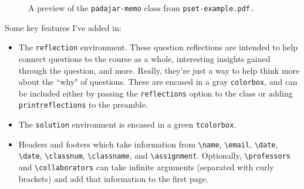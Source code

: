 \documentclass[11pt]{padajar-memo}
\newcommand{\ttslash}[1]{\texttt{\textbackslash #1}}
\begin{document}
\begin{figure}[ht]
	\caption{A preview of the \texttt{padajar-memo} class from \texttt{pset-example.pdf.}}
	\begin{center}
	\end{center}
\end{figure}

Some key features I've added in:
\begin{itemize}
	\item The \texttt{reflection} environment. These question reflections are intended to help connect questions to the course as a whole, interesting insights gained through the question, and more. Really, they're just a way to help think more about the ``why" of questions. These are encased in a gray \texttt{colorbox}, and can be included either by passing the \texttt{reflections} option to the class or adding \texttt{printreflections} to the preamble.

	\item The \texttt{solution} environment is encased in a green \texttt{tcolorbox}.

	\item Headers and footers which take information from \ttslash{name}, \ttslash{email}, \ttslash{date}, \ttslash{date}, \ttslash{classnum}, \ttslash{classname}, and \ttslash{assignment}. Optionally, \ttslash{professors} and \ttslash{collaborators} can take infinite arguments (separated with curly brackets) and add that information to the first page.
\end{itemize}
\end{document}

